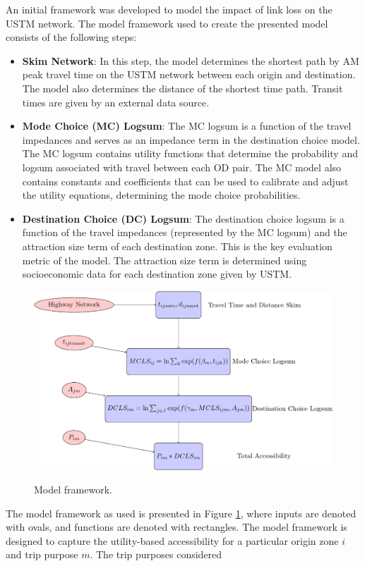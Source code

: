 An initial framework was developed to model the impact of link loss on the
USTM network. The model framework used to create the presented model
consists of the following steps:
\begin{itemize}
	\item \textbf{Skim Network}: In this step, the model determines the shortest
  path by AM peak travel time on the USTM network between each origin and
  destination. The model also determines the distance of the shortest time
  path. Transit times are given by an external data source.
	\item \textbf{Mode Choice (MC) Logsum}: The MC logsum is a function of
  the travel impedances and serves as an impedance term in the destination
  choice model. The MC logsum contains utility functions that
  determine the probability and logsum associated with travel between each OD
  pair. The MC model also contains constants and coefficients that can
  be used to calibrate and adjust the utility equations, determining the mode
  choice probabilities.
	\item \textbf{Destination Choice (DC) Logsum}: The destination choice logsum
  is a function of the travel impedances (represented by the MC logsum)
  and the attraction size term of each destination zone. This is the key
  evaluation metric of the model. The attraction size term is determined
  using socioeconomic data for each destination zone given by USTM.
\end{itemize}
\begin{figure}[h]
  \centering
{\includegraphics[width=0.75\linewidth]{figures/chapter3/framework.png}}
\caption{Model framework.}\label{fig:framework}
\end{figure}
The model framework as used is presented in Figure \ref{fig:framework}, where
inputs are denoted with ovals, and functions are denoted with rectangles.
The model framework is designed to capture the utility-based accessibility for
a particular origin zone \(i\) and trip purpose \(m\). The trip purposes considered
